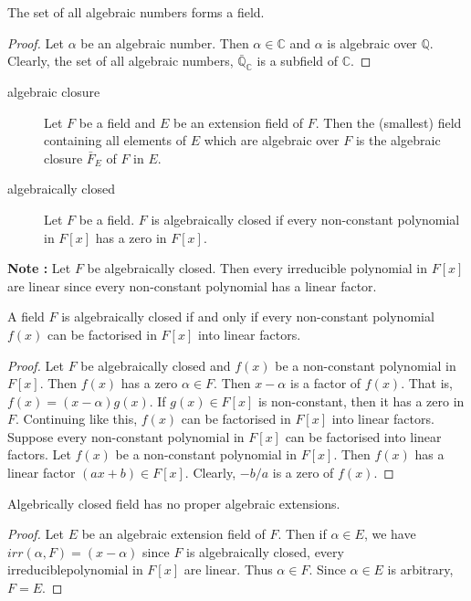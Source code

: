 \begin{corollary}
	The set of all algebraic numbers forms a field.
\end{corollary}
\begin{proof}
	Let $\alpha$ be an algebraic number.
	Then $\alpha \in \mathbb{C}$ and $\alpha$ is algebraic over $\mathbb{Q}$.
	Clearly, the set of all algebraic numbers, $\bar{\mathbb{Q}}_\mathbb{C}$ is a subfield of $\mathbb{C}$.
\end{proof}

\begin{description}
	\item[algebraic closure] Let $F$ be a field and $E$ be an extension field of $F$.
		Then the (smallest) field containing all elements of $E$ which are algebraic over $F$ is the algebraic closure $\bar{F}_E$ of $F$ in $E$.
	\item[algebraically closed] Let $F$ be a field.
		$F$ is algebraically closed if every non-constant polynomial in $F[x]$ has a zero in $F[x]$.
		
\end{description}

\textbf{Note : } Let $F$ be algebraically closed.
Then every irreducible polynomial in $F[x]$ are linear since every non-constant polynomial has a linear factor.

\begin{theorem}
	A field $F$ is algebraically closed if and only if every non-constant polynomial $f(x)$ can be factorised in $F[x]$ into linear factors.
\end{theorem}
\begin{proof}
	Let $F$ be algebraically closed and $f(x)$ be a non-constant polynomial in $F[x]$.
	Then $f(x)$ has a zero $\alpha \in F$.
	Then $x-\alpha$ is a factor of $f(x)$.
	That is, $f(x) = (x-\alpha)g(x)$.
	If $g(x) \in F[x]$ is non-constant, then it has a zero in $F$.
	Continuing like this, $f(x)$ can be factorised in $F[x]$ into linear factors.\\

	Suppose every non-constant polynomial in $F[x]$ can be factorised into linear factors.
	Let $f(x)$ be a non-constant polynomial in $F[x]$.
	Then $f(x)$ has a linear factor $(ax+b) \in F[x]$.
	Clearly, $-b/a$ is a zero of $f(x)$.
\end{proof}

\begin{theorem}
	Algebrically closed field has no proper algebraic extensions.
\end{theorem}
\begin{proof}
	Let $E$ be an algebraic extension field of $F$.
	Then if $\alpha \in E$, we have $irr(\alpha,F) = (x-\alpha)$ since $F$ is algebraically closed, every irreduciblepolynomial in $F[x]$ are linear.
	Thus $\alpha \in F$.
	Since $\alpha \in E$ is arbitrary, $F = E$.
\end{proof}

